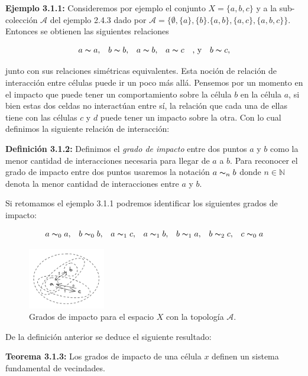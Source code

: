  \textbf{Ejemplo 3.1.1:} Consideremos por ejemplo el conjunto $X=\{a,b,c\}$ y a la sub-colección $\mathcal{A}$ del ejemplo 2.4.3 dado por $\mathcal{A}=\{\emptyset,\{a\},\{b\}.\{a,b\},\{a,c\},\{a,b,c\}\}$. Entonces se obtienen las siguientes relaciones

$$\begin{array}{cccccc}
    a\thicksim a, & b\thicksim b, & a\thicksim b, & a\thicksim c & \text{, y} & b\thicksim c,
\end{array}$$

junto con sus relaciones simétricas equivalentes. Esta noción de relación de interacción entre células puede ir un poco más allá. Pensemos por un momento en el impacto que puede tener un comportamiento sobre la célula $b$ en la célula $a$, si bien estas dos celdas no interactúan entre sí, la relación que cada una de ellas tiene con las células $c$ y $d$ puede tener un impacto sobre la otra. Con lo cual definimos la siguiente relación de interacción:

\textbf{Definición 3.1.2:} Definimos el \textit{grado de impacto} entre dos puntos $a$ y $b$ como la menor cantidad de interacciones necesaria para llegar de $a$ a $b$. Para reconocer el grado de impacto entre dos puntos usaremos la notación $a\thicksim_n b$ donde $n\in\mathbb{N}$ denota la menor cantidad de interacciones entre $a$ y $b$.

Si retomamos el ejemplo 3.1.1 podremos identificar los siguientes grados de impacto:

$$\begin{array}{ccccccc}
    a\thicksim_0 a, & b\thicksim_0 b, & a\thicksim_1 c, & a\thicksim_1 b, &
    b\thicksim_1 a, & b\thicksim_2 c, & c\thicksim_0 a
\end{array}$$
\begin{figure}[h]
  \centering
    \includegraphics[width=0.3\textwidth]{Imagenes/grados_de_impacto.PNG}
  \caption{Grados de impacto para el espacio $X$ con la topología $\mathcal{A}$.}
  \label{fig:gradoImpacto}
\end{figure}

De la definición anterior se deduce el siguiente resultado:

\textbf{Teorema 3.1.3:} Los grados de impacto de una célula $x$ definen un sistema fundamental de vecindades.

